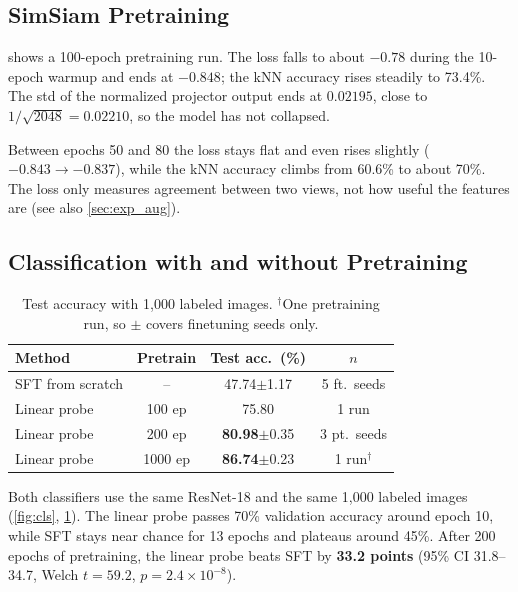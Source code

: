 \documentclass[10pt,twocolumn,letterpaper]{article}
\newcommand{\pmstd}[1]{{\scriptsize$\pm$#1}}
\begin{document}
\subsection{SimSiam Pretraining}
\label{sec:exp_pretrain}



 shows a 100-epoch pretraining run.
The loss falls to about $-0.78$ during the 10-epoch warmup and ends at $-0.848$; the kNN accuracy rises steadily to 73.4\%.
The std of the normalized projector output ends at $0.02195$, close to $1/\sqrt{2048}=0.02210$, so the model has not collapsed.

Between epochs 50 and 80 the loss stays flat and even rises slightly ($-0.843\rightarrow-0.837$), while the kNN accuracy climbs from 60.6\% to about 70\%.
The loss only measures agreement between two views, not how useful the features are (see also \cref{sec:exp_aug}).

\subsection{Classification with and without Pretraining}
\label{sec:exp_cls}



\begin{table}[t]
\centering
\small
\setlength\tabcolsep{4pt}
\begin{tabular}{lccc}
\toprule
Method & Pretrain & Test acc.\ (\%) & $n$ \\
\midrule
SFT from scratch & -- & 47.74\pmstd{1.17} & 5 ft.\ seeds \\
Linear probe & 100 ep & 75.80 & 1 run \\
Linear probe & 200 ep & \textbf{80.98}\pmstd{0.35} & 3 pt.\ seeds \\
Linear probe & 1000 ep & \textbf{86.74}\pmstd{0.23} & 1 run$^\dagger$ \\
\bottomrule
\end{tabular}
\caption{Test accuracy with 1,000 labeled images. $^\dagger$One pretraining run, so $\pm$ covers finetuning seeds only.}
\label{tab:cls}
\end{table}

Both classifiers use the same ResNet-18 and the same 1,000 labeled images (\cref{fig:cls}, \cref{tab:cls}).
The linear probe passes 70\% validation accuracy around epoch 10, while SFT stays near chance for 13 epochs and plateaus around 45\%.
After 200 epochs of pretraining, the linear probe beats SFT by \textbf{33.2 points} (95\% CI 31.8--34.7, Welch $t{=}59.2$, $p{=}2.4\!\times\!10^{-8}$).
\end{document}
